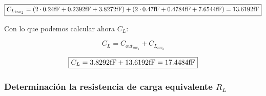 \begin{equation*}
\boxed{ C_{L_{inv_{2}}} =  \left( 2 \cdot 0.24 \si[per-mode=symbol]{\femto\farad} + 0.2392 \si[per-mode=symbol]{\femto\farad} + 3.8272 \si[per-mode=symbol]{\femto\farad} \right) + \left( 2 \cdot 0.47 \si[per-mode=symbol]{\femto\farad} + 0.4784 \si[per-mode=symbol]{\femto\farad} + 7.6544 \si[per-mode=symbol]{\femto\farad} \right) = 13.6192 \si[per-mode=symbol]{\femto\farad} }
\end{equation*}



Con lo que podemos calcular ahora $C_{L}$:


\begin{equation*}
C_{L} = C_{out_{inv_{1}}} + C_{L_{inv_{2}}}
\end{equation*}


\begin{equation*}
\boxed{  C_{L} = 3.8292 \si[per-mode=symbol]{\femto\farad} + 13.6192 \si[per-mode=symbol]{\femto\farad} = 17.4484 \si[per-mode=symbol]{\femto\farad} }
\end{equation*}


\subsubsection{Determinación la resistencia de carga equivalente $R_{L}$}






